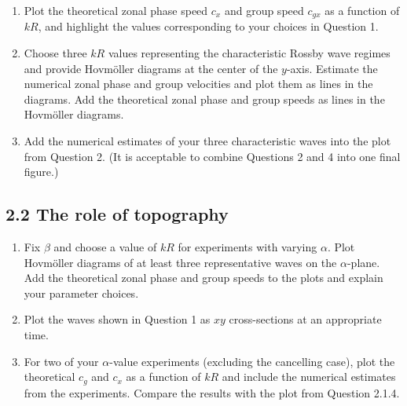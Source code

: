 \begin{question}
\begin{enumerate}
    \item Plot the theoretical zonal phase speed $c_x$ and group speed $c_{gx}$ as a function of $kR$, and highlight the values corresponding to your choices in Question 1.

    \item Choose three $kR$ values representing the characteristic Rossby wave regimes and provide Hovmöller diagrams at the center of the $y$-axis. Estimate the numerical zonal phase and group velocities and plot them as lines in the diagrams. Add the theoretical zonal phase and group speeds as lines in the Hovmöller diagrams.

    \item Add the numerical estimates of your three characteristic waves into the plot from Question 2. (It is acceptable to combine Questions 2 and 4 into one final figure.)
\end{enumerate}

\subsection*{2.2 The role of topography}

\begin{enumerate}
    \item Fix $\beta$ and choose a value of $kR$ for experiments with varying $\alpha$. Plot Hovmöller diagrams of at least three representative waves on the $\alpha$-plane. Add the theoretical zonal phase and group speeds to the plots and explain your parameter choices.

    \item Plot the waves shown in Question 1 as $xy$ cross-sections at an appropriate time.

    \item For two of your $\alpha$-value experiments (excluding the cancelling case), plot the theoretical $c_g$ and $c_x$ as a function of $kR$ and include the numerical estimates from the experiments. Compare the results with the plot from Question 2.1.4.
\end{enumerate}
\end{question}
